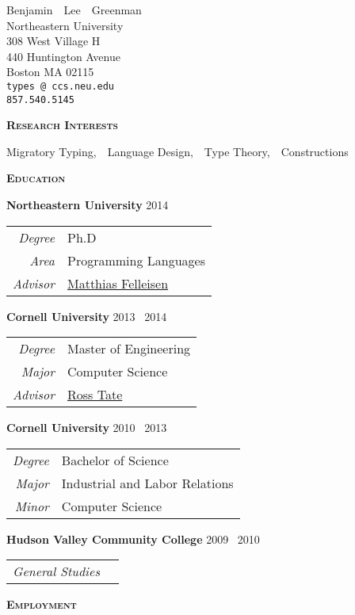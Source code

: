\documentclass{article}
\makeatletter
\renewcommand{\maketitle}{
\begin{center}
  {\large{Benjamin~~Lee~~Greenman}}
\vspace{0.1cm}
\\Northeastern University
\\308 West Village H
\\440 Huntington Avenue
\\Boston MA 02115
\\\texttt{types\,@\,ccs.neu.edu}
\\\texttt{857.540.5145}
\end{center}
}
\newcommand{\mysection}[1]{\vspace{0.5cm}
\hspace{-1.3cm}\textsc{\textbf{#1}}~\hrulefill}
\newcommand{\mysubsection}[1]{\hspace{-10ex}\textbf{#1}}
\makeatother
\begin{document}
\maketitle


\mysection{Research Interests}

Migratory Typing,~~Language Design,~~Type Theory,~~Constructions

\mysection{Education}

\mysubsection{Northeastern University} \hfill 2014 \textendash\ \hphantom{2018}\\
\begin{tabular}{>{\it}r l}
Degree & Ph.D \\
Area & Programming Languages \\
Advisor & \href{http://ccs.neu.edu/home/matthias}{Matthias Felleisen}
\end{tabular}

\mysubsection{Cornell University} \hfill 2013 \textendash\ 2014\\
\begin{tabular}{>{\it}r l}
Degree & Master of Engineering\\
Major & Computer Science\\
Advisor & \href{http://www.cs.cornell.edu/~ross/}{Ross Tate}
\end{tabular}

\mysubsection{Cornell University} \hfill 2010 \textendash\ 2013\\
\begin{tabular}{>{\it}r l}
Degree & Bachelor of Science\\
Major & Industrial and Labor Relations\\
Minor & Computer Science\\
\end{tabular}

\mysubsection{Hudson Valley Community College} \hfill 2009 \textendash\ 2010 \\ 
\begin{tabular}{>{\it}r l}
General Studies & \\
\end{tabular}

\mysection{Employment}
\end{document}
